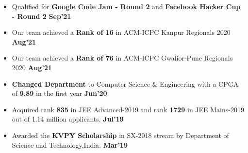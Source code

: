 \documentclass[10pt]{article}
\begin{document}
\vspace{-4ex}
\spacedhrule{0.15ex}{1.0ex}
\begin{itemize}[leftmargin=*]
\item Qualified for \textbf{Google Code Jam - Round 2} and \textbf{Facebook Hacker Cup - Round 2} \href{https://github.com/Abhitipu/Abhitipu/blob/main/Proofs/Cp/Google_Codejam.png} {\hspace{1ex}\footnotesize\faMousePointer} \href{https://github.com/Abhitipu/Abhitipu/blob/main/Proofs/Cp/Fb_HackerCup.png} {\hspace{0.5ex}\footnotesize\faMousePointer} {\hfill}\textbf{Sep'21}\\[-1.8em]
\item Our team achieved a \textbf{Rank of 16} in ACM-ICPC Kanpur Regionals 2020 \href{https://icpc.global/ICPCID/V98CTQD0QYNY} {\hspace{0.5ex}\footnotesize\faMousePointer} {\hfill}\textbf{Aug'21}\\[-1.8em]
\item Our team achieved a \textbf{Rank of 76} in ACM-ICPC Gwalior-Pune Regionals 2020 \href{https://icpc.global/ICPCID/V98CTQD0QYNY} {\hspace{0.5ex}\footnotesize\faMousePointer} {\hfill}\textbf{Aug'21}\\[-1.8em]
\item \textbf{Changed Department} to Computer Science \& Engineering with a CPGA of \textbf{9.89} in the first year \href{https://github.com/Abhitipu/Abhitipu/blob/main/Proofs/Insti\%20docs/BranchChangeAbhinandanProof.pdf} {\hspace{0.5ex}\footnotesize\faMousePointer} {\hfill}\textbf{Jun'20}\\[-1.8em]
 \item Acquired rank \textbf{835} in JEE Advanced-2019 and rank \textbf{1729} in JEE Mains-2019 out of 1.14 million applicants. \href{https://github.com/Abhitipu/Abhitipu/tree/main/Proofs/Competitive\%20exams} {\hspace{0.5ex}\footnotesize\faMousePointer} {\hfill}\textbf{Jul'19}\\[-1.8em]
  \item Awarded the \textbf{KVPY Scholarship} in SX-2018 stream by Department of Science and Technology,India. \href{https://github.com/Abhitipu/Abhitipu/blob/main/Proofs/Competitive\%20exams/KVPYAbhinandanProof.pdf} {\hspace{0.5ex}\footnotesize\faMousePointer} {\hfill}\textbf{Mar'19}\\[-1.8em]

\end{itemize}
\end{document}
